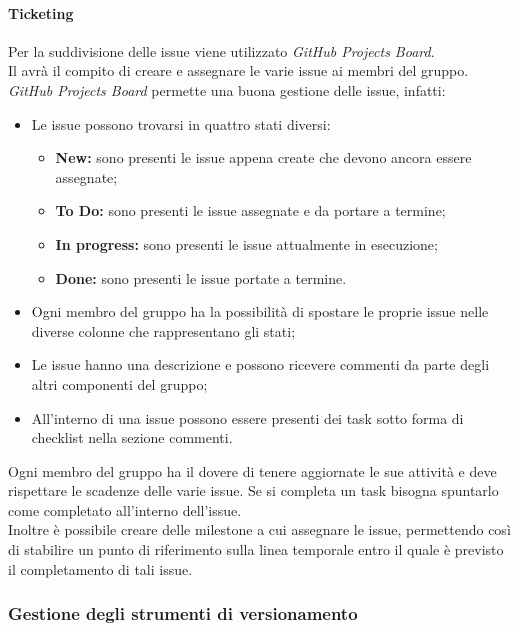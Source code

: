 \paragraph{Ticketing}
Per la suddivisione delle issue\glo{} viene utilizzato \textit{GitHub Projects Board}\glo{}.\\
Il \roleProjectManagerLow{} avrà il compito di creare e assegnare le varie issue\glo{} ai membri del gruppo.\\
\textit{GitHub Projects Board}\glo{} permette una buona gestione delle issue\glo{}, infatti:
\begin{itemize}
  \item Le issue\glo{} possono trovarsi in quattro stati diversi:
        \begin{itemize}
          \item \textbf{New:} sono presenti le issue\glo{} appena create che devono ancora essere assegnate;
          \item \textbf{To Do:} sono presenti le issue\glo{} assegnate e da portare a termine;
          \item \textbf{In progress:} sono presenti le issue\glo{} attualmente in esecuzione;
          \item \textbf{Done:} sono presenti le issue\glo{} portate a termine.
        \end{itemize}
  \item Ogni membro del gruppo ha la possibilità di spostare le proprie issue\glo{} nelle diverse colonne che rappresentano gli stati;
  \item Le issue\glo{} hanno una descrizione e possono ricevere commenti da parte degli altri componenti del gruppo;
  \item All'interno di una issue\glo{} possono essere presenti dei task sotto forma di checklist nella sezione commenti.
\end{itemize}
Ogni membro del gruppo ha il dovere di tenere aggiornate le sue attività e deve rispettare le scadenze delle varie issue\glo{}.
Se si completa un task bisogna spuntarlo come completato all'interno dell'issue\glo{}.\\
Inoltre è possibile creare delle milestone\glo{} a cui assegnare le issue\glo{}, permettendo così di stabilire un punto di
riferimento sulla linea temporale entro il quale è previsto il completamento di tali issue\glo{}.

\subsubsection{Gestione degli strumenti di versionamento}
